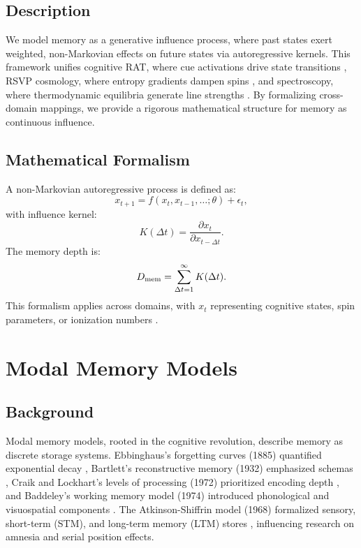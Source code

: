 \documentclass[12pt]{article}
\begin{document}
\subsection{Description}
We model memory as a generative influence process, where past states exert weighted, non-Markovian effects on future states via autoregressive kernels. This framework unifies cognitive RAT, where cue activations drive state transitions \citep{Barenholtz2025}, RSVP cosmology, where entropy gradients dampen spins \citep{PacucciLoeb2025}, and spectroscopy, where thermodynamic equilibria generate line strengths \citep{Payne1925}. By formalizing cross-domain mappings, we provide a rigorous mathematical structure for memory as continuous influence.

\subsection{Mathematical Formalism}
A non-Markovian autoregressive process is defined as:
\begin{equation}
x_{t+1} = f(x_t, x_{t-1}, \dots; \theta) + \epsilon_t,
\end{equation}
with influence kernel:
\begin{equation}
K(\Delta t) = \frac{\partial x_t}{\partial x_{t-\Delta t}}.
\end{equation}
The memory depth is:
\begin{equation}
D_{\rm mem} = \sum_{\Delta t=1}^\infty K(\Delta t).
\end{equation}
This formalism applies across domains, with $x_t$ representing cognitive states, spin parameters, or ionization numbers \citep{Barenholtz2025, PacucciLoeb2025, Payne1925}.

\section{Modal Memory Models}
\subsection{Background}
Modal memory models, rooted in the cognitive revolution, describe memory as discrete storage systems. Ebbinghaus’s forgetting curves (1885) quantified exponential decay \citep{Ebbinghaus1885}, Bartlett’s reconstructive memory (1932) emphasized schemas \citep{Bartlett1932}, Craik and Lockhart’s levels of processing (1972) prioritized encoding depth \citep{CraikLockhart1972}, and Baddeley’s working memory model (1974) introduced phonological and visuospatial components \citep{Baddeley1974}. The Atkinson-Shiffrin model (1968) formalized sensory, short-term (STM), and long-term memory (LTM) stores \citep{AtkinsonShiffrin1968}, influencing research on amnesia and serial position effects.
\end{document}
